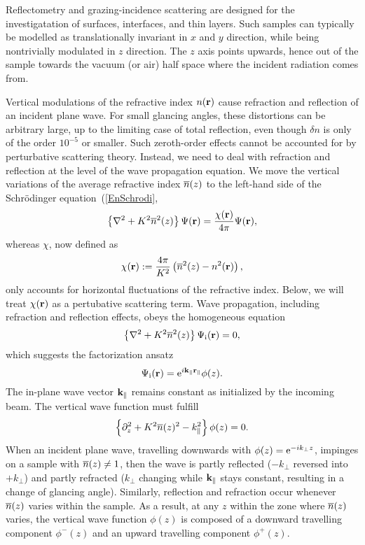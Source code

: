 Reflectometry and grazing-incidence scattering
are designed for the investigatation of surfaces, interfaces, and thin layers.
Such samples can typically be modelled as translationally invariant
in $x$ and $y$ direction,
while being nontrivially modulated in $z$ direction.
The $z$ axis points upwards, hence out of the sample towards the
vacuum (or air) half space where the incident radiation comes from.

Vertical modulations of the refractive index $n(\mathbf{r})$
cause refraction and reflection of an incident plane wave.
For small glancing angles,
these distortions can be arbitrary large,
up to the limiting case of total reflection,
even though $\delta n$ is only of the order $10^{-5}$ or smaller.
Such zeroth-order effects cannot be accounted for
by perturbative scattering theory.
Instead, we need to deal with refraction and reflection
at the level of the wave propagation equation.
We move the vertical variations of the average refractive index $\overline{n}(z)$
to the left-hand side of the Schrödinger equation~(\ref{EnSchrodi},
\begin{equation}\label{EHelmholtzGraded}
  \left\{\mathbf{\nabla}^2+K^2\overline{n}^2(z)\right\}\Psi(\mathbf{r})
  = \frac{\chi(\mathbf{r})}{4\pi}\Psi(\mathbf{r}),
\end{equation}
whereas $\chi$, now defined as
\begin{equation}\label{EChiGraded}
  \chi(\mathbf{r}) := \frac{4\pi}{K^2}\left(\overline{n}^2(z)-n^2(\mathbf{r})\right),
\end{equation}
only accounts for horizontal fluctuations of the refractive index.
Below, we will treat $\chi(\mathbf{r})$ as a pertubative scattering term.
Wave propagation, including refraction and reflection effects,
obeys the homogeneous equation
\begin{equation}\label{EHelmholtzGradedHomog}
  \left\{\mathbf{\nabla}^2+K^2\overline{n}^2(z)\right\}\Psi_\text{i}(\mathbf{r}) = 0,
\end{equation}
which suggests the factorization ansatz
\begin{equation}\label{Ewave3}
\Psi_\text{i}(\mathbf{r}) = {\rm e}^{i \mathbf{k}_\parallel\mathbf{r}_\parallel} \phi(z).
\end{equation}
The in-plane wave vector $\mathbf{k}_\parallel$ remains constant
as initialized by the incoming beam.
The vertical wave function must fulfill
\begin{equation}\label{Ewavez}
\left\{\partial_z^2 + K^2\overline{n}(z)^2 - k_\parallel^2 \right\} \phi(z) = 0.
\end{equation}
When an incident plane wave,
travelling downwards with
$\phi(z)={\rm e}^{-ik_\perp z}$,
impinges on a sample with $\overline{n}(z)\ne 1$,
then the wave is partly reflected ($-k_\perp$ reversed into $+k_\perp$)
and partly refracted
($k_\perp$ changing while $\mathbf{k}_\parallel$ stays constant,
resulting in a change of glancing angle).
Similarly, reflection and refraction occur
whenever $\overline{n}(z)$ varies within the sample.
As a result, at any $z$ within the zone where $\overline{n}(z)$ varies,
the vertical wave function $\phi(z)$ is composed of a
downward travelling component $\phi^-(z)$
and an upward travelling component $\phi^+(z)$.

